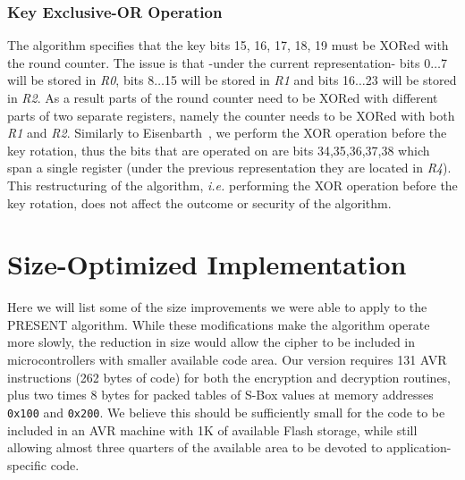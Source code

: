 \documentclass[11pt]{llncs2e} %
\begin{document}
\subsubsection{Key Exclusive-OR Operation} \label{key_xor}
The algorithm specifies that the key bits 15, 16, 17, 18, 19 must be XORed with the round counter. The issue is that -under the current representation- bits 0$\dots$7 will be stored in \textit{R0}, bits 8$\dots$15 will be stored in \textit{R1} and bits 16$\dots$23 will be stored in \textit{R2}.
As a result parts of the round counter need to be XORed with different parts of two separate registers, namely the counter needs to be XORed with both \textit{R1} and \textit{R2}.
Similarly to Eisenbarth~\cite{eisenbarth2012compact}, we perform the XOR operation before the key rotation, thus the bits that are operated on are bits 34,35,36,37,38 which span a single register (under the previous representation they are located in \textit{R4}). This restructuring of the algorithm, \emph{i.e.} performing the XOR operation before the key rotation, does not affect the outcome or security of the algorithm. 



\section{Size-Optimized Implementation}

Here we will list some of the size improvements we were able to apply to the PRESENT algorithm.
While these modifications make the algorithm operate more slowly, the reduction in size would allow the cipher to be included in microcontrollers with smaller available code area.
Our version requires 131 AVR instructions (262 bytes of code) for both the encryption and decryption routines, plus two times 8 bytes for packed tables of S-Box values at memory addresses \texttt{0x100} and \texttt{0x200}.
We believe this should be sufficiently small for the code to be included in an AVR machine with 1K of available Flash storage, while still allowing almost three quarters of the available area to be devoted to application-specific code.
\end{document}
